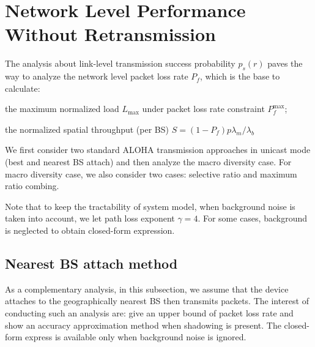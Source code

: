 \section{Network Level Performance Without Retransmission}
\label{sec:op_over_infinite_plane}
The analysis about link-level transmission success probability $p_s(r)$ paves the way to analyze the network level packet loss rate $P_{f}$, which is the base to calculate:\begin{inparaenum}[1)]
	\item the maximum normalized load $L_{\text{max}}$ under packet loss rate constraint $P_{f}^{\text{max}}$;
	\item the normalized spatial throughput (per BS) $S = (1-P_{f}) p\lambda_{m}/ \lambda_{b}$
\end{inparaenum}
We first consider two standard ALOHA transmission approaches in unicast mode (best and nearest BS attach) and then analyze the macro diversity case. For macro diversity case, we also consider two cases: selective ratio and maximum ratio combing.

Note that to keep the tractability of system model, when background noise is taken into account, we let path loss exponent $\gamma=4$. For some cases, background is neglected to obtain closed-form expression.
\subsection{Nearest BS attach method}
\label{sec:nearest_BS_attach_method}
As a complementary analysis, in this subsection, we assume that the device attaches to the geographically nearest BS then transmits packets. The interest of conducting such an analysis are: give an upper bound of packet loss rate and show an accuracy approximation method when shadowing is present. The closed-form express is available only when background noise is ignored.

